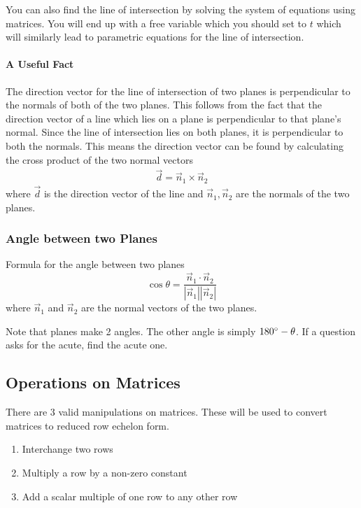 \documentclass{report}
\theoremstyle{definition}
\numberwithin{equation}{section}
\begin{document}
You can also find the line of intersection by solving the system of equations using matrices. You will end up with a free variable which you should set to $t$ which will similarly lead to parametric equations for the line of intersection.

\paragraph{A Useful Fact}
The direction vector for the line of intersection of two planes is perpendicular to the normals of both of the two planes. 
This follows from the fact that the direction vector of a line which lies on a plane is perpendicular to that plane's normal. Since the line of intersection lies on both planes, it is perpendicular to both the normals.
This means the direction vector can be found by calculating the cross product of the two normal vectors
\begin{align*}
	\vec d = \vec n_1 \times \vec n_2
\end{align*}
where $\vec d$ is the direction vector of the line and $\vec n_1, \vec n_2$ are the normals of the two planes.

\subsubsection{Angle between two Planes}
Formula for the angle between two planes
\begin{equation}
	\cos \theta = \frac{\vec n_1 \cdot \vec n_2}{|\vec n_1||\vec n_2|}
\end{equation}
where $\vec n_1$ and $\vec n_2$ are the normal vectors of the two planes.

Note that planes make 2 angles. The other angle is simply $180 \degree - \theta$. If a question asks for the acute, find the acute one.
\subsection{Operations on Matrices}
There are 3 valid manipulations on matrices. These will be used to convert matrices to reduced row echelon form.
\begin{enumerate}
	\item Interchange two rows
	\item Multiply a row by a non-zero constant
	\item Add a scalar multiple of one row to any other row
\end{enumerate}
\end{document}
